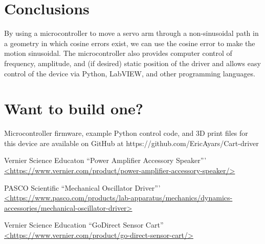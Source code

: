 \documentclass[prb,preprint]{revtex4-1}
\begin{document}
\section{Conclusions}
By using a microcontroller to move a servo arm through a non-sinusoidal path in a geometry in which cosine errors exist, we can use the cosine error to make the motion sinusoidal.
The microcontroller also provides computer control of frequency, amplitude, and (if desired) static position of the driver and allows easy control of the device via Python, LabVIEW, and other programming languages.

\section{Want to build one?}
Microcontroller firmware, example Python control code, and 3D print files for this device are available on GitHub at https://github.com/EricAyars/Cart-driver

\begin{thebibliography}{3}
 Vernier Science Educaton ``Power Amplifier Accessory Speaker''' \url{<https://www.vernier.com/product/power-amplifier-accessory-speaker/>}

 PASCO Scientific ``Mechanical Oscillator Driver''' \url{<https://www.pasco.com/products/lab-apparatus/mechanics/dynamics-accessories/mechanical-oscillator-driver>}

 Vernier Science Education ``GoDirect Sensor Cart'' \url{<https://www.vernier.com/product/go-direct-sensor-cart/>}

\end{thebibliography}
\end{document}
